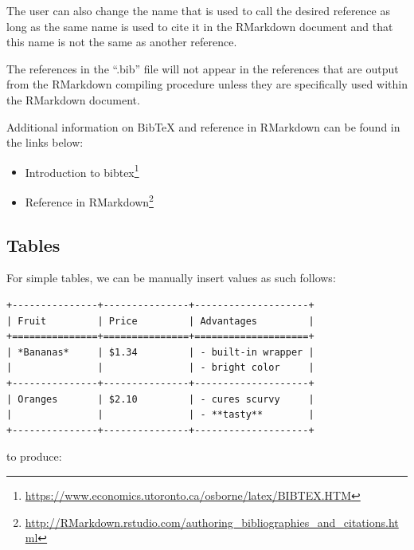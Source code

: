 \documentclass[12pt,]{krantz}
\providecommand{\tightlist}{%
  \setlength{\itemsep}{0pt}\setlength{\parskip}{0pt}}
\renewcommand{\href}[2]{#2\footnote{\url{#1}}}
\let\BeginKnitrBlock\begin \let\EndKnitrBlock\end
\begin{document}
\BeginKnitrBlock{rmdnote}
The user can also change the name that is used to call the desired
reference as long as the same name is used to cite it in the RMarkdown
document and that this name is not the same as another reference.
\EndKnitrBlock{rmdnote}

\BeginKnitrBlock{rmdcaution}
The references in the ``.bib'' file will not appear in the references
that are output from the RMarkdown compiling procedure unless they are
specifically used within the RMarkdown document.
\EndKnitrBlock{rmdcaution}

Additional information on BibTeX and reference in RMarkdown can be found
in the links below:

\begin{itemize}
\tightlist
\item
  \href{https://www.economics.utoronto.ca/osborne/latex/BIBTEX.HTM}{Introduction
  to bibtex}
\item
  \href{http://RMarkdown.rstudio.com/authoring_bibliographies_and_citations.html}{Reference
  in RMarkdown}
\end{itemize}

\subsection{Tables}\label{tables}

For simple tables, we can be manually insert values as such follows:

\begin{verbatim}
+---------------+---------------+--------------------+
| Fruit         | Price         | Advantages         |
+===============+===============+====================+
| *Bananas*     | $1.34         | - built-in wrapper |
|               |               | - bright color     |
+---------------+---------------+--------------------+
| Oranges       | $2.10         | - cures scurvy     |
|               |               | - **tasty**        |
+---------------+---------------+--------------------+
\end{verbatim}

to produce:
\end{document}
